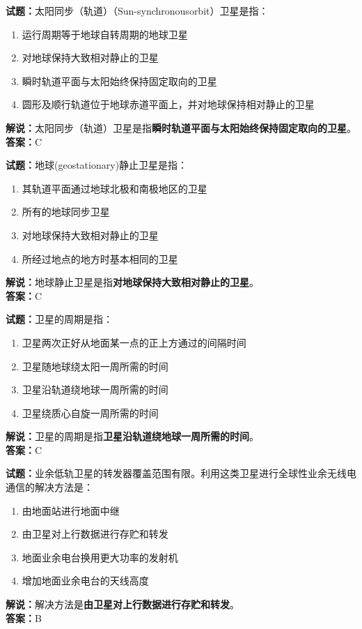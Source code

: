 \documentclass{ctexbook}
\begin{document}
\bigskip


\noindent\textbf{试题：}太阳同步（轨道）（Sun-synchronousorbit）卫星是指：
\begin{enumerate}[leftmargin=3em]
\item 运行周期等于地球自转周期的地球卫星
\item 对地球保持大致相对静止的卫星
\item 瞬时轨道平面与太阳始终保持固定取向的卫星
\item 圆形及顺行轨道位于地球赤道平面上，并对地球保持相对静止的卫星
\end{enumerate}
\noindent\textbf{解说：}太阳同步（轨道）卫星是指\textbf{瞬时轨道平面与太阳始终保持固定取向的卫星}。\\\noindent\textbf{答案：}C



\bigskip


\noindent\textbf{试题：}地球(geostationary)静止卫星是指：
\begin{enumerate}[leftmargin=3em]
\item 其轨道平面通过地球北极和南极地区的卫星
\item 所有的地球同步卫星
\item 对地球保持大致相对静止的卫星
\item 所经过地点的地方时基本相同的卫星
\end{enumerate}
\noindent\textbf{解说：}地球静止卫星是指\textbf{对地球保持大致相对静止的卫星}。\\\noindent\textbf{答案：}C




\bigskip


\noindent\textbf{试题：}卫星的周期是指：
\begin{enumerate}[leftmargin=3em]
\item 卫星两次正好从地面某一点的正上方通过的间隔时间
\item 卫星随地球绕太阳一周所需的时间
\item 卫星沿轨道绕地球一周所需的时间
\item 卫星绕质心自旋一周所需的时间
\end{enumerate}
\noindent\textbf{解说：}卫星的周期是指\textbf{卫星沿轨道绕地球一周所需的时间}。\\\noindent\textbf{答案：}C



\bigskip


\noindent\textbf{试题：}业余低轨卫星的转发器覆盖范围有限。利用这类卫星进行全球性业余无线电通信的解决方法是：
\begin{enumerate}[leftmargin=3em]
\item 由地面站进行地面中继
\item 由卫星对上行数据进行存贮和转发
\item 地面业余电台换用更大功率的发射机
\item 增加地面业余电台的天线高度
\end{enumerate}
\noindent\textbf{解说：}解决方法是\textbf{由卫星对上行数据进行存贮和转发}。\\\noindent\textbf{答案：}B
\end{document}

